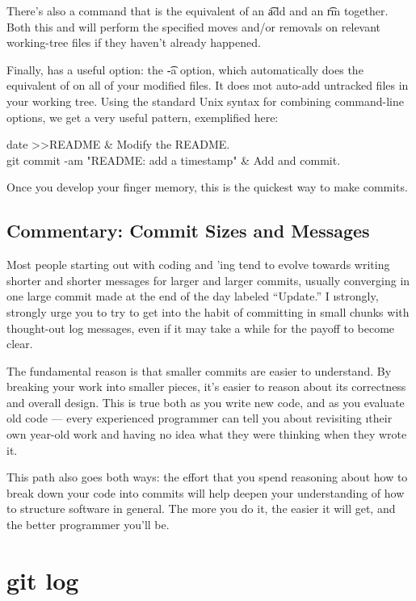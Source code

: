 \documentclass[letterpaper, 12pt, titlepage, twoside]{article}
\begin{document}
There's also a  command that is the equivalent of an \t{add} and an
\t{rm} together. Both this and  will perform the specified moves
and/or removals on relevant working-tree files if they haven't already
happened.

Finally,  has a useful option: the \t{-a} option, which
automatically does the equivalent of  on all of your modified files.
It does \i{not} auto-add untracked files in your working tree. Using the
standard Unix syntax for combining command-line options, we get a very
useful pattern, exemplified here:

\begin{typeme}
date >>README & Modify the README. \\
git commit -am "README: add a timestamp" & Add and commit.
\end{typeme}

Once you develop your finger memory, this is the quickest way to make commits.

\subsection*{Commentary: Commit Sizes and Messages}

Most people starting out with coding and \git'ing tend to evolve towards
writing shorter and shorter messages for larger and larger commits, usually
converging in one large commit made at the end of the day labeled ``Update.''
I \i{strongly, strongly urge} you to try to get into the habit of committing
in small chunks with thought-out log messages, even if it may take a while for
the payoff to become clear.

The fundamental reason is that smaller commits are easier to understand. By
breaking your work into smaller pieces, it's easier to reason about its
correctness and overall design. This is true both as you write new code, and
as you evaluate old code --- every experienced programmer can tell you about
revisiting \i{their own} year-old work and having no idea what they were
thinking when they wrote it.

This path also goes both ways: the effort that you spend reasoning about how
to break down your code into commits will help deepen your understanding of
how to structure software in general. The more you do it, the easier it will
get, and the better programmer you'll be.


\section{git log}
\end{document}
